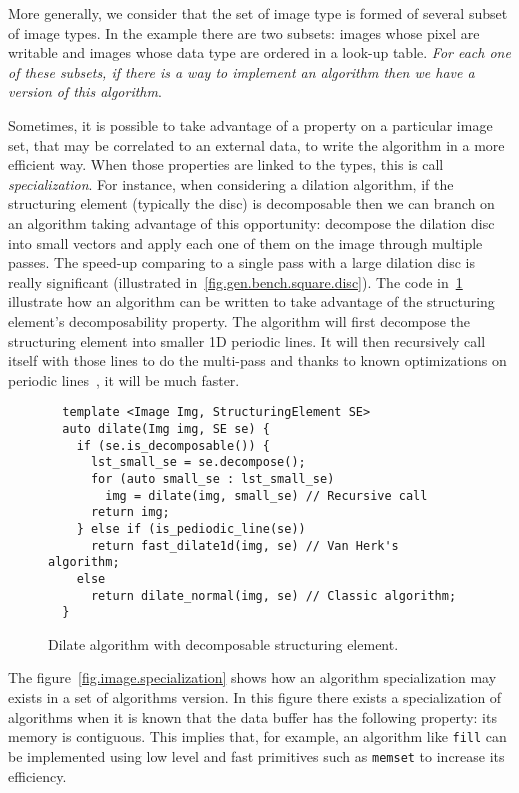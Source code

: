 More generally, we consider that the set of image type is formed of several subset of image types. In the example there
are two subsets: images whose pixel are writable and images whose data type are ordered in a look-up table. \emph{For
  each one of these subsets, if there is a way to implement an algorithm then we have a \emph{version} of this algorithm}.

Sometimes, it is possible to take advantage of a property on a particular image set, that may be correlated to an
external data, to write the algorithm in a more efficient way. When those properties are linked to the types, this is
call \emph{specialization}. For instance, when considering a dilation algorithm, if the structuring element (typically
the disc) is decomposable then we can branch on an algorithm taking advantage of this opportunity: decompose the
dilation disc into small vectors and apply each one of them on the image through multiple passes. The speed-up comparing
to a single pass with a large dilation disc is really significant (illustrated in~\ref{fig.gen.bench.square.disc}). The
code in~\ref{fig.decomp.dilate} illustrate how an algorithm can be written to take advantage of the structuring
element's decomposability property. The algorithm will first decompose the structuring element into smaller 1D periodic
lines. It will then recursively call itself with those lines to do the multi-pass and thanks to known optimizations on
periodic lines~\cite{vanherk.1992.localminmax}, it will be much faster.


\begin{figure}[tbh]
  \centering
  \begin{verbatim}
  template <Image Img, StructuringElement SE>
  auto dilate(Img img, SE se) {
    if (se.is_decomposable()) {
      lst_small_se = se.decompose();
      for (auto small_se : lst_small_se)
        img = dilate(img, small_se) // Recursive call
      return img;
    } else if (is_pediodic_line(se))
      return fast_dilate1d(img, se) // Van Herk's algorithm;
    else
      return dilate_normal(img, se) // Classic algorithm;
  }
  \end{verbatim}

  \caption{Dilate algorithm with decomposable structuring element.}
  \label{fig.decomp.dilate}
\end{figure}

The figure~\ref{fig.image.specialization} shows how an algorithm specialization may exists in a set of algorithms
version. In this figure there exists a specialization of algorithms when it is known that the data buffer has the
following property: its memory is contiguous. This implies that, for example, an algorithm like \texttt{fill} can be
implemented using low level and fast primitives such as \texttt{memset} to increase its efficiency.

